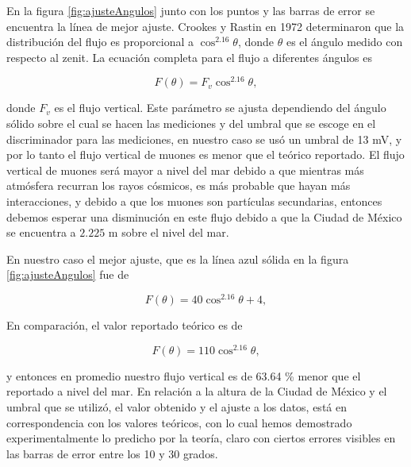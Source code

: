 \documentclass[a4paper,10pt]{article}
\numberwithin{equation}{section}
\begin{document}
En la figura \eqref{fig:ajusteAngulos} junto con los puntos y las barras de error se encuentra la línea de mejor ajuste. Crookes 
y Rastin en 1972 \cite{crookes} determinaron que la distribución del flujo es proporcional 
a $\cos^{2.16}{\theta}$, donde $\theta$ es el ángulo medido con respecto al zenit. La 
ecuación completa para el flujo a diferentes ángulos es 

\begin{equation}
 F(\theta) = F_v\cos^{2.16}{\theta},
\end{equation}

donde $F_v$ es el flujo vertical. Este parámetro se ajusta dependiendo del ángulo 
sólido sobre el cual se hacen las mediciones y del umbral que se escoge en el discriminador 
para las mediciones, en nuestro caso se usó un umbral de 13 mV, y por lo tanto el flujo 
vertical de muones es menor que el teórico reportado. El flujo vertical de muones 
será mayor a nivel del mar debido a que mientras más atmósfera recurran los rayos 
cósmicos, es más probable que hayan más interacciones, y debido a que los muones son 
partículas secundarias, entonces debemos esperar una disminución en este flujo debido 
a que la Ciudad de México se encuentra a $2.225$ m sobre el nivel del mar. 

\vspace{.3cm}

En nuestro caso el mejor ajuste, que es la línea azul sólida en la
figura \eqref{fig:ajusteAngulos} fue de 

\begin{equation}
  F(\theta) = 40\cos^{2.16}{\theta} + 4 ,
\end{equation}

En comparación, el valor reportado teórico es de 

\begin{equation}
  F(\theta) = 110\cos^{2.16}{\theta},
\end{equation}

y entonces en promedio nuestro flujo vertical es de 63.64 \% menor que el reportado
a nivel del mar. En relación a la altura de la Ciudad de México y el umbral que se 
utilizó, el valor obtenido y el ajuste a los datos, está en correspondencia con los 
valores teóricos, con lo cual hemos demostrado experimentalmente lo predicho por la teoría, claro 
con ciertos errores visibles en las barras de error entre los 10 y 30 grados.

\vspace{.3cm}
\end{document}
